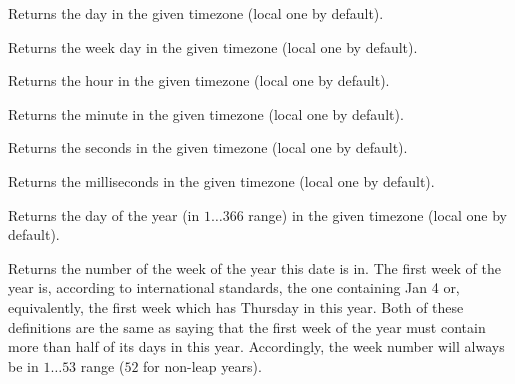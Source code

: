
Returns the day in the given timezone (local one by default).


\label{wxdatetimegetweekday}


Returns the week day in the given timezone (local one by default).


\label{wxdatetimegethour}


Returns the hour in the given timezone (local one by default).


\label{wxdatetimegetminute}


Returns the minute in the given timezone (local one by default).


\label{wxdatetimegetsecond}


Returns the seconds in the given timezone (local one by default).


\label{wxdatetimegetmillisecond}


Returns the milliseconds in the given timezone (local one by default).


\label{wxdatetimegetdayofyear}


Returns the day of the year (in $1\ldots366$ range) in the given timezone
(local one by default).


\label{wxdatetimegetweekofyear}


Returns the number of the week of the year this date is in. The first week of
the year is, according to international standards, the one containing Jan 4 or,
equivalently, the first week which has Thursday in this year. Both of these
definitions are the same as saying that the first week of the year must contain
more than half of its days in this year. Accordingly, the week number will
always be in $1\ldots53$ range ($52$ for non-leap years).

